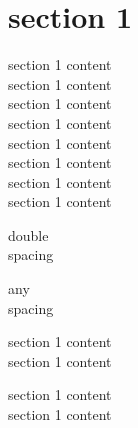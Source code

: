 \documentclass[12pt]{article}
\begin{document}
        \section{section 1}
            \begin{flushleft}
            
            \singlespacing  %
             section 1 content \\
             section 1 content \\
             
             \onehalfspacing    %
             section 1 content \\
             section 1 content \\
             
             \doublespacing %
             section 1 content \\
             section 1 content \\ 
                         
             section 1 content \\
             section 1 content \\ 
             
            \begin{doublespacing}
            double\\spacing
            \end{doublespacing}
            \begin{spacing}{1.25}
            any\\spacing
            \end{spacing}

             \end{flushleft}    
             
            \begin{flushright}
             section 1 content \\
             section 1 content
             \end{flushright}  
             
            \begin{center}
             section 1 content \\
             section 1 content
             \end{center}                 
\end{document}
